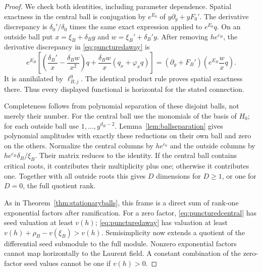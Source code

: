 \begin{proof}
We check both identities, including parameter dependence. Spatial
exactness in the central ball is conjugation by $e^{E_0}$ of
$y\partial_y+yF_0'$. The derivative discrepancy is
$\delta_0'/\delta_0$ times the same exact expression applied to
$e^{E_0}q$. On an outside ball put $x=\xi_B+\delta_B y$ and
$w=\xi_B'+\delta_B'y$. After removing $h e^{c_B}$, the derivative
discrepancy in \eqref{eq:puncturedaway} is
\[
 e^{E_B}\left[
   \left(\frac{\delta_B'}x-\frac{\delta_B w}{x^2}\right)q
        +\frac{\delta_B w}x(q_x+\varphi_xq)\right]
 = (\partial_y+F_B')\left(e^{E_B}\frac wxq\right).
\]
It is annihilated by $\ell^0_{B,j}$. The identical product rule
proves spatial exactness there. Thus every displayed functional is
horizontal for the stated connection.

Completeness follows from polynomial separation of these disjoint
balls, not merely their number. For the central ball use the monomials
of the basis of $H_0$; for each outside ball use
$1,\ldots,y^{d_B-2}$. Lemma~\ref{lem:ballseparation} gives polynomial
amplitudes with exactly these reductions on their own ball and zero
on the others. Normalize the central columns by $h e^{c_0}$ and
the outside columns by $h e^{c_B}\delta_B/\xi_B$. Their matrix
reduces to the identity. If the central ball contains critical roots,
it contributes their multiplicity plus one; otherwise it contributes
one. Together with all outside roots this gives $D$ dimensions for
$D\geq1$, or one for $D=0$, the full quotient rank.

As in Theorem~\ref{thm:stationaryballs}, this frame is a direct sum
of rank-one exponential factors after ramification. For a zero factor,
\eqref{eq:puncturedcentral} has seed valuation at least $v(h)$;
\eqref{eq:puncturedaway} has valuation at least
$v(h)+\rho_B-v(\xi_B)>v(h)$. Semisimplicity now extends a quotient
of the differential seed submodule to the full module. Nonzero
exponential factors cannot map horizontally to the Laurent field.
A constant combination of the zero-factor seed values cannot be
one if $v(h)>0$.
\end{proof}

